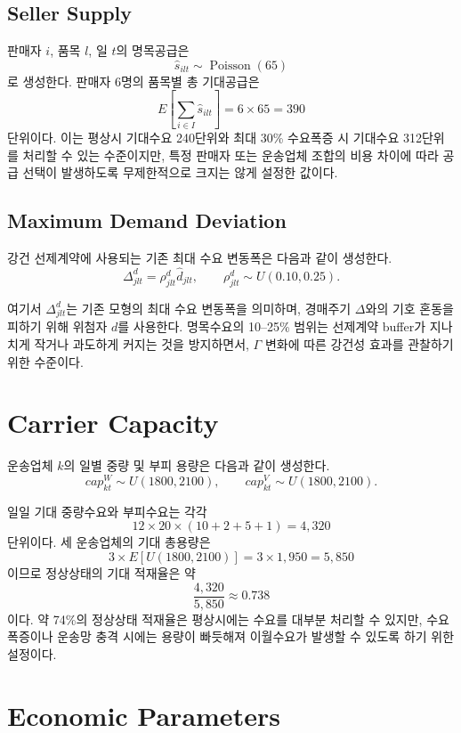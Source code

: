 \documentclass[11pt,a4paper]{article}
\begin{document}
\subsection{Seller Supply}
판매자 $i$, 품목 $l$, 일 $t$의 명목공급은
\[
\hat s_{ilt}\sim \operatorname{Poisson}(65)
\]
로 생성한다. 판매자 6명의 품목별 총 기대공급은
\[
E\left[\sum_{i\in I}\hat s_{ilt}\right]
=6\times65=390
\]
단위이다. 이는 평상시 기대수요 240단위와 최대 30\% 수요폭증 시 기대수요 312단위를 처리할 수 있는 수준이지만, 특정 판매자 또는 운송업체 조합의 비용 차이에 따라 공급 선택이 발생하도록 무제한적으로 크지는 않게 설정한 값이다.

\subsection{Maximum Demand Deviation}
강건 선제계약에 사용되는 기존 최대 수요 변동폭은 다음과 같이 생성한다.
\[
\Delta^{d}_{jlt}=\rho^{d}_{jlt}\hat d_{jlt},
\qquad
\rho^{d}_{jlt}\sim U(0.10,0.25).
\]

여기서 $\Delta^{d}_{jlt}$는 기존 모형의 최대 수요 변동폭을 의미하며, 경매주기 $\Delta$와의 기호 혼동을 피하기 위해 위첨자 $d$를 사용한다. 명목수요의 10--25\% 범위는 선제계약 buffer가 지나치게 작거나 과도하게 커지는 것을 방지하면서, $\Gamma$ 변화에 따른 강건성 효과를 관찰하기 위한 수준이다.

\section{Carrier Capacity}
운송업체 $k$의 일별 중량 및 부피 용량은 다음과 같이 생성한다.
\[
cap^{W}_{kt}\sim U(1800,2100),
\qquad
cap^{V}_{kt}\sim U(1800,2100).
\]

일일 기대 중량수요와 부피수요는 각각
\[
12\times20\times(10+2+5+1)=4{,}320
\]
단위이다. 세 운송업체의 기대 총용량은
\[
3\times E[U(1800,2100)]
=3\times1{,}950=5{,}850
\]
이므로 정상상태의 기대 적재율은 약
\[
\frac{4{,}320}{5{,}850}\approx0.738
\]
이다. 약 74\%의 정상상태 적재율은 평상시에는 수요를 대부분 처리할 수 있지만, 수요 폭증이나 운송망 충격 시에는 용량이 빠듯해져 이월수요가 발생할 수 있도록 하기 위한 설정이다.

\section{Economic Parameters}
\end{document}

